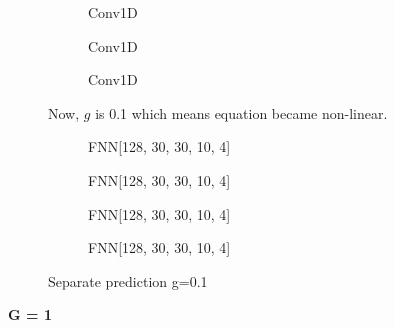 \documentclass[a4paper,times,12pt]{article}
\begin{document}
\begin{figure}[H]
    \centering
    \begin{subfigure}[t]{0.45\textwidth}
		\centering
        
        \caption{Conv1D}
		\label{fig:a}
    \end{subfigure}\hfill
    \begin{subfigure}[t]{0.45\textwidth}
		\centering
        
        \caption{Conv1D}
		\label{fig:b}
    \end{subfigure}\hfill    
    \begin{subfigure}[t]{0.45\textwidth}
        \centering
        
        \caption{Conv1D}
		\label{fig:c}
    \end{subfigure}
	\caption{Now, $g$ is 0.1 which means equation became non-linear. }
\end{figure}

\begin{figure}[H]
    \centering
    \begin{subfigure}[t]{0.45\textwidth}
		\centering
        
        \caption{FNN[128, 30, 30, 10, 4]}
		\label{fig:a}
    \end{subfigure}\hfill
    \begin{subfigure}[t]{0.45\textwidth}
		\centering
        
        \caption{FNN[128, 30, 30, 10, 4]}
		\label{fig:b}
    \end{subfigure}\hfill    
    \begin{subfigure}[t]{0.45\textwidth}
        \centering
        
        \caption{FNN[128, 30, 30, 10, 4]}
		\label{fig:c}
    \end{subfigure}\hfill
    \begin{subfigure}[t]{0.45\textwidth}
        \centering
        
        \caption{FNN[128, 30, 30, 10, 4]}
		\label{fig:c}
    \end{subfigure}
	\caption{Separate prediction  g=0.1}
\end{figure}

\textbf{G = 1}
\end{document}
